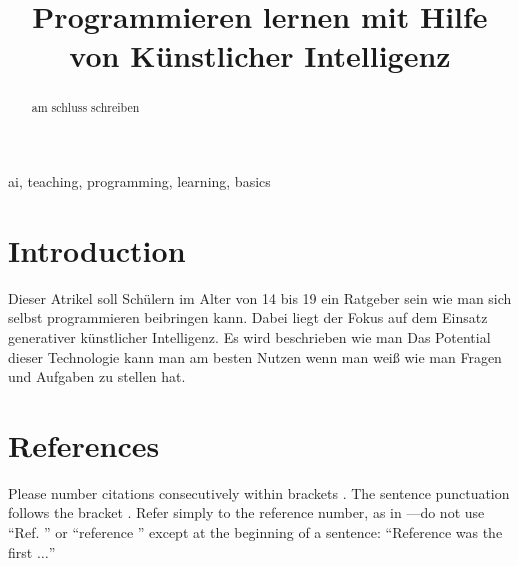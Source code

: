 \documentclass[conference]{IEEEtran}
\begin{document}
\title{Programmieren lernen mit Hilfe von Künstlicher Intelligenz
}

\author{
}

\maketitle

\begin{abstract}
am schluss schreiben
\end{abstract}

\begin{IEEEkeywords}
ai, teaching, programming, learning, basics
\end{IEEEkeywords}

\section{Introduction}
Dieser Atrikel soll Schülern im Alter von 14 bis 19 ein Ratgeber sein wie man sich selbst programmieren beibringen kann. Dabei liegt der Fokus auf dem Einsatz generativer künstlicher Intelligenz. Es wird beschrieben wie man  Das Potential dieser Technologie kann man am besten Nutzen wenn man weiß wie man Fragen und Aufgaben zu stellen hat. 


%   
%
% 




\section*{References}

Please number citations consecutively within brackets \cite{b1}. The 
sentence punctuation follows the bracket \cite{b2}. Refer simply to the reference 
number, as in \cite{b3}---do not use ``Ref. \cite{b3}'' or ``reference \cite{b3}'' except at 
the beginning of a sentence: ``Reference \cite{b3} was the first $\ldots$''
\end{document}
